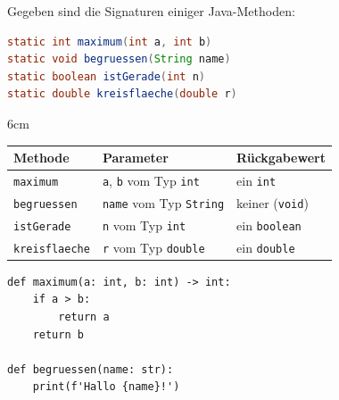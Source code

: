 \question[4]
Gegeben sind die Signaturen einiger Java-Methoden:
\begin{lstlisting}[language=Java]
static int maximum(int a, int b)
static void begruessen(String name)
static boolean istGerade(int n)
static double kreisflaeche(double r)
\end{lstlisting}

\begin{solutionbox}{6cm}
\mbox{}\par\smallskip
\begin{tabular}{lll}
Methode & Parameter & Rückgabewert \\ \hline
\texttt{maximum} & \texttt{a}, \texttt{b} vom Typ \texttt{int} & ein \texttt{int} \\
\texttt{begruessen} & \texttt{name} vom Typ \texttt{String} & keiner (\texttt{void}) \\
\texttt{istGerade} & \texttt{n} vom Typ \texttt{int} & ein \texttt{boolean} \\
\texttt{kreisflaeche} & \texttt{r} vom Typ \texttt{double} & ein \texttt{double} \\
\end{tabular}
\begin{lstlisting}
def maximum(a: int, b: int) -> int:
    if a > b:
        return a
    return b

def begruessen(name: str):
    print(f'Hallo {name}!')
\end{lstlisting}
\end{solutionbox}

